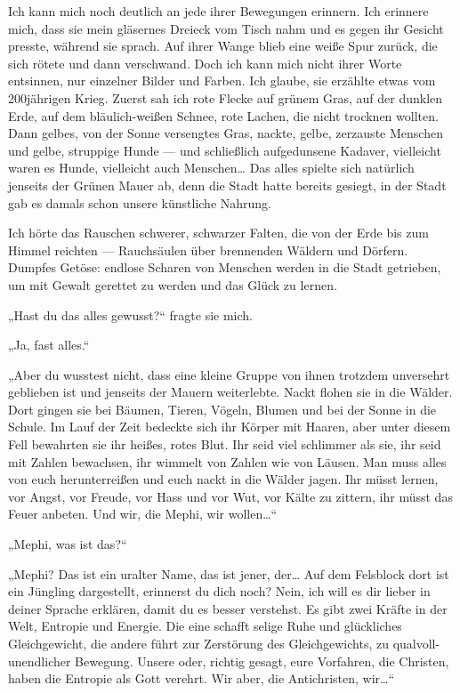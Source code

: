 Ich kann mich noch deutlich an jede ihrer
Bewegungen erinnern. Ich erinnere mich, dass sie mein gläsernes
Dreieck vom Tisch nahm und es gegen ihr Gesicht presste, während
sie sprach. Auf ihrer Wange blieb eine weiße Spur zurück, die sich
rötete und dann verschwand. Doch ich kann mich nicht ihrer Worte
entsinnen, nur einzelner Bilder und Farben. Ich glaube, sie
erzählte etwas vom 200jährigen Krieg. Zuerst sah ich rote Flecke
auf grünem Gras, auf der dunklen Erde, auf dem bläulich-weißen
Schnee, rote Lachen, die nicht trocknen wollten. Dann gelbes, von
der Sonne versengtes Gras, nackte, gelbe, zerzauste Menschen und
gelbe, struppige Hunde — und schließlich aufgedunsene Kadaver,
vielleicht waren es Hunde, vielleicht auch Menschen\ldots{} Das alles
spielte sich natürlich jenseits der Grünen Mauer ab, denn die Stadt
hatte bereits gesiegt, in der Stadt gab es damals schon unsere
künstliche Nahrung.

Ich hörte das Rauschen schwerer, schwarzer Falten, die von der Erde
bis zum Himmel reichten — Rauchsäulen über brennenden Wäldern und
Dörfern. Dumpfes Getöse: endlose Scharen von Menschen werden in die
Stadt getrieben, um mit Gewalt gerettet zu werden und das Glück zu
lernen.

„Hast du das alles gewusst?“ fragte sie mich.

„Ja, fast alles.“

„Aber du wusstest nicht, dass eine kleine Gruppe von ihnen trotzdem
unversehrt geblieben ist und jenseits der Mauern weiterlebte. Nackt
flohen sie in die Wälder. Dort gingen sie bei Bäumen, Tieren,
Vögeln, Blumen und bei der Sonne in die Schule. Im Lauf der Zeit
bedeckte sich ihr Körper mit Haaren, aber unter diesem Fell
bewahrten
sie ihr heißes, rotes Blut. Ihr seid viel schlimmer als sie, ihr
seid mit Zahlen bewachsen, ihr wimmelt von Zahlen wie von Läusen.
Man muss alles von euch herunterreißen und euch nackt in die Wälder
jagen. Ihr müsst lernen, vor Angst, vor Freude, vor Hass und vor
Wut, vor Kälte zu zittern, ihr müsst das Feuer anbeten. Und wir,
die Mephi, wir wollen\ldots{}“

„Mephi, was ist das?“

„Mephi? Das ist ein uralter Name, das ist jener, der\ldots{} Auf dem
Felsblock dort ist ein Jüngling dargestellt, erinnerst du dich
noch? Nein, ich will es dir lieber in deiner Sprache erklären,
damit du es besser verstehst. Es gibt zwei Kräfte in der Welt,
Entropie und Energie. Die eine schafft selige Ruhe und glückliches
Gleichgewicht, die andere führt zur Zerstörung des Gleichgewichts,
zu qualvoll-unendlicher Bewegung. Unsere oder, richtig gesagt, eure
Vorfahren, die Christen, haben die Entropie als Gott verehrt. Wir
aber, die Antichristen, wir\ldots{}“

